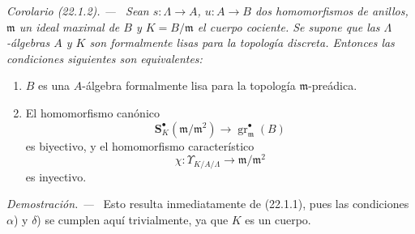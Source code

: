 \documentclass[10pt,oneside]{book}
\makeatletter
\newcommand{\setmanualcurrentlabel}[1]{\def\@currentlabel{#1}}
\newenvironment{corollary}[1][]{%
  \setmanualcurrentlabel{#1}\par\medskip\noindent\itshape Corolario (#1). ---\ }{\par}
\newenvironment{proof}{%
  \par\medskip\noindent\textit{Demostración. ---\ }}{\par}
\makeatother
\begin{document}
\begin{corollary}[22.1.2]
\label{0.22.1.2-es}
Sean $s:\Lambda\to A$, $u:A\to B$ dos homomorfismos de anillos,
$\mathfrak m$ un ideal maximal de $B$ y $K=B/\mathfrak m$ el cuerpo cociente.
Se supone que las $\Lambda$-álgebras $A$ y $K$ son formalmente lisas para la
topología discreta. Entonces las condiciones siguientes son equivalentes:
\begin{enumerate}
  \item[\textup{a)}] $B$ es una $A$-álgebra formalmente lisa para la topología
  $\mathfrak m$-preádica.
  \item[\textup{b)}] El homomorfismo canónico
  \begin{equation}
  \tag{22.1.2.1}
  \label{0.22.1.2.1-es}
    \mathbf S_K^\bullet(\mathfrak m/\mathfrak m^2)
    \longrightarrow\operatorname{gr}_{\mathfrak m}^\bullet(B)
  \end{equation}
  es biyectivo, y el homomorfismo característico
  \begin{equation}
  \tag{22.1.2.2}
  \label{0.22.1.2.2-es}
    \chi:\Upsilon_{K/A/\Lambda}\longrightarrow\mathfrak m/\mathfrak m^2
  \end{equation}
  es inyectivo.
\end{enumerate}
\end{corollary}

\begin{proof}
Esto resulta inmediatamente de (22.1.1), pues las condiciones $\alpha$) y
$\delta$) se cumplen aquí trivialmente, ya que $K$ es un cuerpo.
\end{proof}
\end{document}
